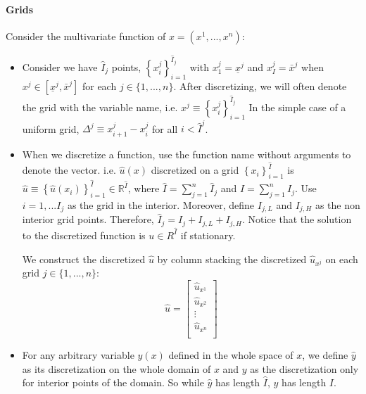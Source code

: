 \documentclass[11pt]{article}
\newcommand{\set}[1]{\ensuremath{\left\{{#1}\right\}}}
\newcommand{\R}{\ensuremath{\mathbb{R}}}
\begin{document}
\paragraph{Grids}Consider the multivariate function of $x = (x^1,...,x^n )$:
\begin{itemize}
	\item Consider we have $\hat{I}_j$ points, $\set{x^j_i}_{i=1}^{\hat{I}_j}$%
	with $x^j_1 = \underline{x}^j$ and $x^j_I = \bar{x}^j$ when $x^j \in [\underline{x}^j, \bar{x}^j]$ for each $j \in \{1,...,n\}$.  After discretizing, we will often denote the grid with the variable name, i.e. $x^j \equiv \set{x^j_i}_{i=1}^{\hat{I}_j}$
	In the simple case of a uniform grid, $\Delta^j \equiv x_{i+1}^j - x_i^j$ for all $i < \hat{I}^j$.
	\item When we discretize a function, use the function name without arguments to denote the vector.  i.e. $\hat{u}(x)$ discretized on a grid $\set{x_i}_{i=1}^{\hat{I}}$  is $\hat{u} \equiv \set{\hat{u}(x_i)}_{i=1}^{\hat{I}} \in \R^{\hat{I}}$, where $\hat{I} = \sum_{j=1}^n \hat{I}_j$ and $I = \sum_{j = 1}^n I_j$.
	Use $i=1,... I_j$ as the grid in the interior. Moreover, define $I_{j,L}$ and $I_{j,H}$ as the non interior grid points. Therefore, $\hat{I}_j = I_j + I_{j,L} + I_{j,H}$. %
	Notice that the solution to the discretized function is $u \in R^{\hat{I}}$ if stationary.
	
	We construct the discretized $\hat{u}$ by column stacking the discretized $\hat{u}_{x^j}$ on each grid $j \in \{1,...,n\}$:
	\begin{equation}
		\hat{u} = \begin{bmatrix}
			\hat{u}_{x^1}\\
			\hat{u}_{x^2}\\
			\vdots\\
			\hat{u}_{x^n}\\
		\end{bmatrix}\label{u_def}
	\end{equation}
	
	
	
	\item For any arbitrary variable $y(x)$ defined in the whole space of $x$, we define $\hat{y}$ as its discretization on the whole domain of $x$ and $y$ as the discretization only for interior points of the domain. So while $\hat{y}$ has length $\hat{I}$, $y$ has length $I$.
\end{itemize}
\end{document}
